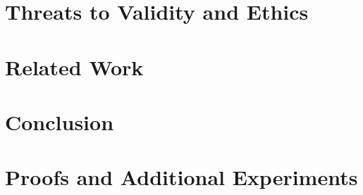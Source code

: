 \documentclass[acmsmall,screen,review,anonymous]{acmart}
\theoremstyle{plain}
\theoremstyle{definition}
\theoremstyle{remark}
\begin{document}
\section{Threats to Validity and Ethics}

\section{Related Work}

\section{Conclusion}





\appendix

\section{Proofs and Additional Experiments}
\end{document}

